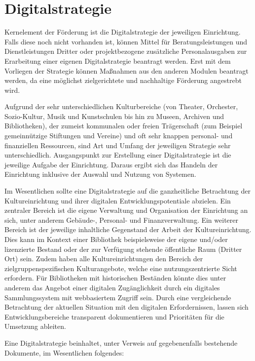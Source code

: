 \documentclass[a4paper,
fontsize=11pt,
oneside,
numbers=noperiodatend,
parskip=half-,
bibliography=totoc,
final
]{scrartcl}
\begin{document}
\section{Digitalstrategie}\label{digitalstrategie}

Kernelement der Förderung ist die Digitalstrategie der jeweiligen
Einrichtung. Falls diese noch nicht vorhanden ist, können Mittel für
Beratungsleistungen und Dienstleistungen Dritter oder projektbezogene
zusätzliche Personalausgaben zur Erarbeitung einer eigenen
Digitalstrategie beantragt werden. Erst mit dem Vorliegen der Strategie
können Maßnahmen aus den anderen Modulen beantragt werden, da eine
möglichst zielgerichtete und nachhaltige Förderung angestrebt wird.

Aufgrund der sehr unterschiedlichen Kulturbereiche (von Theater,
Orchester, Sozio-Kultur, Musik und Kunstschulen bis hin zu Museen,
Archiven und Bibliotheken), der zumeist kommunalen oder freien
Trägerschaft (zum Beispiel gemeinnützige Stiftungen und Vereine) und oft
sehr knappen personal- und finanziellen Ressourcen, sind Art und Umfang
der jeweiligen Strategie sehr unterschiedlich. Ausgangspunkt zur
Erstellung einer Digitalstrategie ist die jeweilige Aufgabe der
Einrichtung. Daraus ergibt sich das Handeln der Einrichtung inklusive
der Auswahl und Nutzung von Systemen.

Im Wesentlichen sollte eine Digitalstrategie auf die ganzheitliche
Betrachtung der Kultureinrichtung und ihrer digitalen
Entwicklungspotentiale abzielen. Ein zentraler Bereich ist die eigene
Verwaltung und Organisation der Einrichtung an sich, unter anderem
Gebäude-, Personal- und Finanzverwaltung. Ein weiterer Bereich ist der
jeweilige inhaltliche Gegenstand der Arbeit der Kultureinrichtung. Dies
kann im Kontext einer Bibliothek beispielsweise der eigene und/oder
lizenzierte Bestand oder der zur Verfügung stehende öffentliche Raum
(Dritter Ort) sein. Zudem haben alle Kultureinrichtungen den Bereich der
zielgruppenspezifischen Kulturangebote, welche eine nutzungszentrierte
Sicht erfordern. Für Bibliotheken mit historischen Beständen könnte dies
unter anderem das Angebot einer digitalen Zugänglichkeit durch ein
digitales Sammlungssystem mit webbasiertem Zugriff sein. Durch eine
vergleichende Betrachtung der aktuellen Situation mit den digitalen
Erfordernissen, lassen sich Entwicklungsbereiche transparent
dokumentieren und Prioritäten für die Umsetzung ableiten.

Eine Digitalstrategie beinhaltet, unter Verweis auf gegebenenfalls
bestehende Dokumente, im Wesentlichen folgendes:
\end{document}

